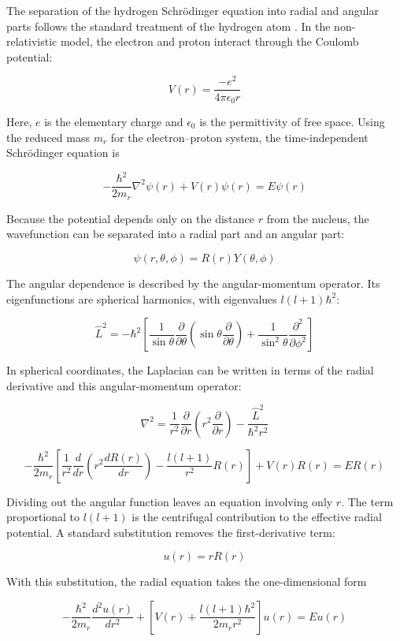 \documentclass[12pt,a4paper]{article}
\begin{document}
The separation of the hydrogen Schr\"odinger equation into
radial and angular parts follows the standard treatment of the
hydrogen atom \cite{openstaxHydrogen}. In the non-relativistic
model, the electron and proton interact through the Coulomb
potential:

\[
    V(r) = \frac{-e^2}{4 \pi \epsilon_0 r}
\]

Here, $e$ is the elementary charge and $\epsilon_0$ is the
permittivity of free space. Using the reduced mass $m_r$ for
the electron--proton system, the time-independent Schr\"odinger
equation is

\[
    -\frac{\hbar^2}{2m_r} \nabla^2 \psi(r) + V(r) \psi(r) = E \psi(r)
\]

Because the potential depends only on the distance $r$ from the
nucleus, the wavefunction can be separated into a radial part
and an angular part:

\[
    \psi(r, \theta, \phi) = R(r) Y(\theta, \phi)
\]

The angular dependence is described by the angular-momentum
operator. Its eigenfunctions are spherical harmonics, with
eigenvalues $l(l+1)\hbar^2$:

\[
    \hat{L}^2 = -\hbar^2 \left[ \frac{1}{\sin\theta} \frac{\partial}{\partial \theta} \left( \sin\theta \frac{\partial}{\partial \theta} \right) + \frac{1}{\sin^2\theta} \frac{\partial^2}{\partial \phi^2} \right]  
\]

In spherical coordinates, the Laplacian can be written in
terms of the radial derivative and this angular-momentum
operator:

\[
    \nabla^2 = \frac{1}{r^2} \frac{\partial}{\partial r} \left( r^2 \frac{\partial}{\partial r} \right) - \frac{\hat{L}^2}{\hbar^2 r^2}
\]

\[
    -\frac{\hbar^2}{2m_r} \left[ \frac{1}{r^2} \frac{d}{dr} \left( r^2 \frac{dR(r)}{dr} \right) - \frac{l(l+1)}{r^2} R(r) \right] + V(r) R(r) = E R(r)
\]

Dividing out the angular function leaves an equation involving
only $r$. The term proportional to $l(l+1)$ is the centrifugal
contribution to the effective radial potential. A standard
substitution removes the first-derivative term:

\[
    u(r) = r R(r)
\]

With this substitution, the radial equation takes the
one-dimensional form

\[
    -\frac{\hbar^2}{2m_r} \frac{d^2 u(r)}{dr^2} + \left[ V(r) + \frac{l(l+1)\hbar^2}{2m_r r^2} \right] u(r) = E u(r)
\]
\end{document}
